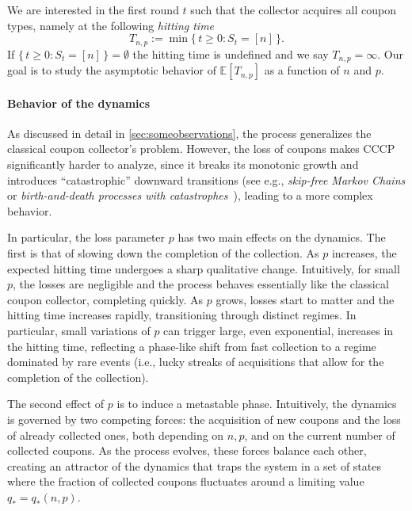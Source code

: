 \documentclass[11pt,a4paper]{article}
\newcommand{\E}{\mathbb{E}}
\begin{document}
We are interested in the first round $t$ such that the collector acquires all coupon types, namely at the following \textit{hitting time}
\[
    T_{n,p} := \min\{\, t \ge 0 : S_t = [n] \,\}.
\]
If $\{\, t \ge 0 : S_t = [n] \,\} = \emptyset$ the hitting time is undefined and we say $T_{n,p} = \infty$.
Our goal is to study the asymptotic behavior of 
$\E[T_{n,p}]$ as a function of $n$ and $p$.



\paragraph*{Behavior of the dynamics}
As discussed in detail in \cref{sec:someobservations}, the process generalizes the classical coupon collector's problem.
However, the loss of coupons makes CCCP significantly harder to analyze, since it breaks its monotonic growth and introduces ``catastrophic'' downward transitions (see e.g., \textit{skip-free Markov Chains} \cite{feller1971introduction} or \textit{birth-and-death processes with catastrophes}~\cite{brockwell1985extinction}), leading to a more complex behavior.

In particular, the loss parameter $p$ has two main effects on the dynamics.
The first is that of slowing down the completion of the collection. As $p$ increases, the expected hitting time undergoes a sharp qualitative change. 
Intuitively, for small $p$, the losses are negligible and the process behaves essentially like the classical coupon collector, completing quickly. As $p$ grows, losses start to matter and the hitting time increases rapidly, transitioning through distinct regimes. In particular, small variations of $p$ can trigger large, even exponential, increases in the hitting time, reflecting a phase-like shift from fast collection to a regime dominated by rare events (i.e., lucky streaks of acquisitions that allow for the completion of the collection).

The second effect of $p$ is to induce a metastable phase. Intuitively, the dynamics is governed by two competing forces: the acquisition of new coupons and the loss of already collected ones, both depending on $n,p$, and on the current number of collected coupons.
As the process evolves, these forces balance each other, creating an attractor of the dynamics that traps the system in a set of states where the fraction of collected coupons fluctuates around a limiting value $q_* = q_*(n,p)$.
\end{document}
